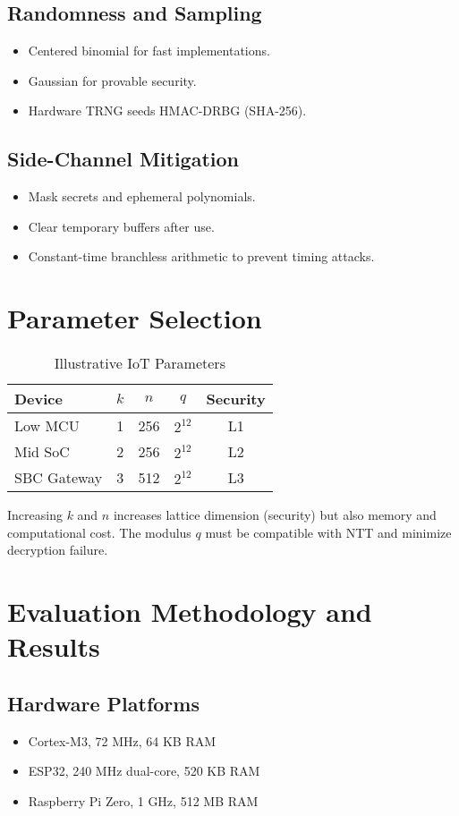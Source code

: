 \documentclass[conference]{IEEEtran}
\begin{document}
\subsection{Randomness and Sampling}
\begin{itemize}
    \item Centered binomial for fast implementations.
    \item Gaussian for provable security.
    \item Hardware TRNG seeds HMAC-DRBG (SHA-256).
\end{itemize}

\subsection{Side-Channel Mitigation}
\begin{itemize}
    \item Mask secrets and ephemeral polynomials.
    \item Clear temporary buffers after use.
    \item Constant-time branchless arithmetic to prevent timing attacks.
\end{itemize}

\section{Parameter Selection}
\begin{table}[H]
\centering
\caption{Illustrative IoT Parameters}
\begin{tabular}{@{}lcccc@{}}
\toprule
Device & $k$ & $n$ & $q$ & Security \\ \midrule
Low MCU & 1 & 256 & $2^{12}$ & L1 \\
Mid SoC & 2 & 256 & $2^{12}$ & L2 \\
SBC Gateway & 3 & 512 & $2^{12}$ & L3 \\
\bottomrule
\end{tabular}
\end{table}
Increasing $k$ and $n$ increases lattice dimension (security) but also memory and computational cost. The modulus $q$ must be compatible with NTT and minimize decryption failure.

\section{Evaluation Methodology and Results}
\subsection{Hardware Platforms}
\begin{itemize}
    \item Cortex-M3, 72 MHz, 64 KB RAM
    \item ESP32, 240 MHz dual-core, 520 KB RAM
    \item Raspberry Pi Zero, 1 GHz, 512 MB RAM
\end{itemize}
\end{document}
